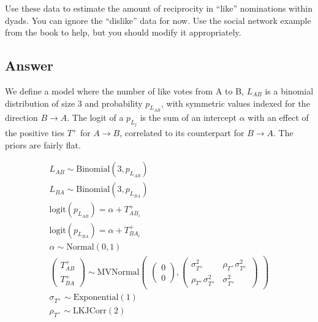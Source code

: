 \documentclass[
]{article}
\begin{document}
Use these data to estimate the amount of reciprocity in ``like''
nominations within dyads. You can ignore the ``dislike'' data for now.
Use the social network example from the book to help, but you should
modify it appropriately.

\hypertarget{answer}{%
\subsection{Answer}\label{answer}}

We define a model where the number of like votes from A to B, \(L_{AB}\)
is a binomial distribution of size 3 and probability \(p_{L_{AB}}\),
with symmetric values indexed for the direction \(B \rightarrow A\). The
logit of a \(p_{L_j}\) is the sum of an intercept \(\alpha\) with an
effect of the positive ties \(T^+\) for \(A \rightarrow B\), correlated
to its counterpart for \(B \rightarrow A\). The priors are fairly flat.

\[
\begin{aligned}
    L_{AB} \sim \text{Binomial}(3, p_{L_{AB}})\\
    L_{BA} \sim \text{Binomial}(3, p_{L_{BA}})\\
    \text{logit}(p_{L_{AB}}) = \alpha + T^+_{AB_i}\\
    \text{logit}(p_{L_{BA}}) = \alpha + T^+_{BA_i}\\
    \alpha \sim \text{Normal}(0,1)\\
    \begin{pmatrix}T^+_{AB}\\T^+_{BA}\end{pmatrix} \sim \text{MVNormal}\begin{pmatrix}\begin{pmatrix}0\\0\end{pmatrix}, \begin{pmatrix}\sigma_{T^+}^2 & \rho_{T^+}\sigma_{T^+}^2\\\rho_{T^+}\sigma_{T^+}^2 &\sigma_{T^+}^2\end{pmatrix}\end{pmatrix}\\
    \sigma_{T^+} \sim \text{Exponential}(1)\\
    \rho_{T^+} \sim \text{LKJCorr}(2)
\end{aligned}
\]
\end{document}

